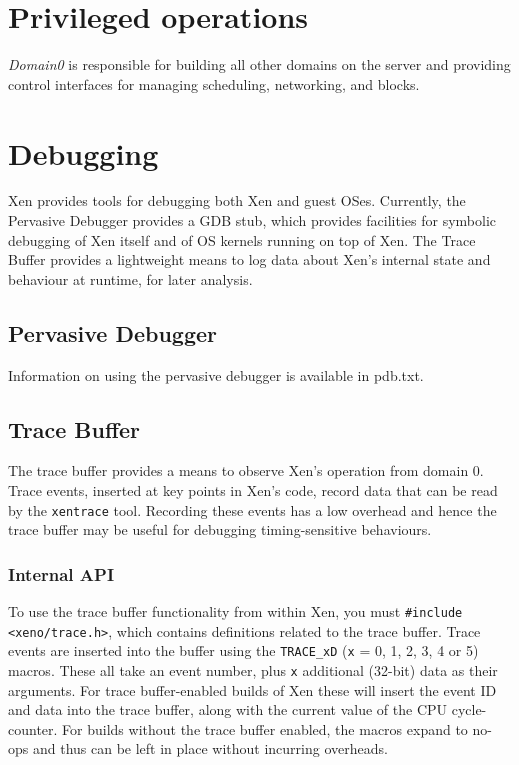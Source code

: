 \documentclass[11pt,twoside,final,openright]{xenstyle}
\begin{document}

\chapter{Privileged operations}
{\it Domain0} is responsible for building all other domains on the server
and providing control interfaces for managing scheduling, networking, and
blocks.


\chapter{Debugging}

Xen provides tools for debugging both Xen and guest OSes.  Currently, the
Pervasive Debugger provides a GDB stub, which provides facilities for symbolic
debugging of Xen itself and of OS kernels running on top of Xen.  The Trace
Buffer provides a lightweight means to log data about Xen's internal state and
behaviour at runtime, for later analysis.

\section{Pervasive Debugger}

Information on using the pervasive debugger is available in pdb.txt.


\section{Trace Buffer}

The trace buffer provides a means to observe Xen's operation from domain 0.
Trace events, inserted at key points in Xen's code, record data that can be
read by the {\tt xentrace} tool.  Recording these events has a low overhead
and hence the trace buffer may be useful for debugging timing-sensitive
behaviours.

\subsection{Internal API}

To use the trace buffer functionality from within Xen, you must {\tt \#include
<xeno/trace.h>}, which contains definitions related to the trace buffer.  Trace
events are inserted into the buffer using the {\tt TRACE\_xD} ({\tt x} = 0, 1,
2, 3, 4 or 5) macros.  These all take an event number, plus {\tt x} additional
(32-bit) data as their arguments.  For trace buffer-enabled builds of Xen these
will insert the event ID and data into the trace buffer, along with the current
value of the CPU cycle-counter.  For builds without the trace buffer enabled,
the macros expand to no-ops and thus can be left in place without incurring
overheads.
\end{document}
